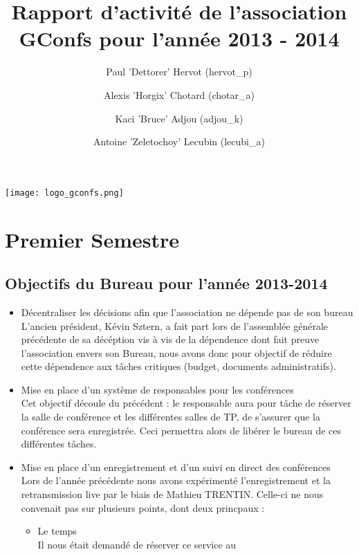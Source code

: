 \documentclass[12pt]{report}
\title{Rapport d'activité de l'association GConfs pour l'année 2013 - 2014}
\author{Paul 'Dettorer' Hervot (hervot\_p)
        \and Alexis 'Horgix' Chotard (chotar\_a)
        \and Kaci 'Bruce' Adjou (adjou\_k)
        \and Antoine 'Zeletochoy' Lecubin (lecubi\_a)}
\begin{document}
    \begin{titlepage}
        \texttt{[image: logo\_gconfs.png]} \\
        {\let\newpage\relax\maketitle}
    \end{titlepage}
    \chapter{Premier Semestre}
    \section{Objectifs du Bureau pour l'année 2013-2014}
    \begin{itemize}
        \item Décentraliser les décisions afin que l'association ne dépende pas
                de son bureau\\
                L'ancien président, Kévin Sztern, a fait part lors de
                l'assemblée générale précédente de sa décéption vis à vis de la
                dépendence dont fait preuve l'association envers son Bureau,
                nous avons donc pour objectif de réduire cette dépendence aux
                tâches critiques (budget, documents administratifs).
        \item Mise en place d'un système de responsables pour les conférences\\
                Cet objectif découle du précédent : le responsable aura pour
                tâche de réserver la salle de conférence et les différentes
                salles de TP, de s'assurer que la conférence sera enregistrée.
                Ceci permettra alors de libérer le bureau de ces différentes
                tâches.
        \item Mise en place d'un enregistrement et d'un suivi en direct des
                conférences\\
                Lors de l'année précédente nous avons expérimenté
                l'enregistrement et la retransmission live par le biais de
                Mathieu TRENTIN. Celle-ci ne nous convenait pas sur plusieurs
                points, dont deux princpaux :
                \begin{itemize}
                        \item Le temps \\
                                Il nous était demandé de réserver ce service au

\end{itemize}
\end{itemize}
\end{document}
